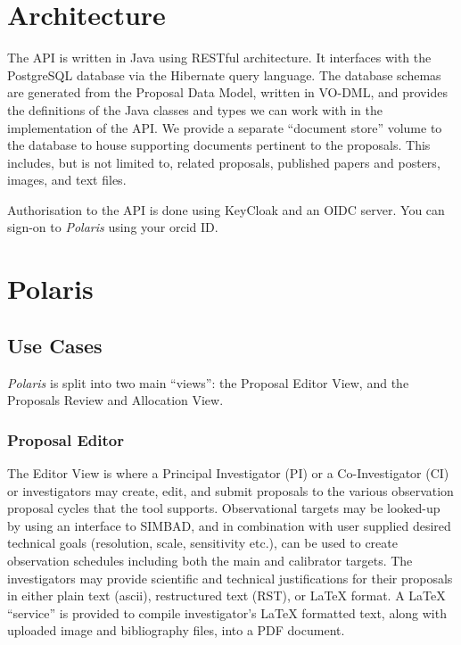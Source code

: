 \documentclass[11pt,twoside]{article}
\begin{document}

\section{Architecture}\label{sec:architecture}


The API is written in Java using RESTful architecture.
It interfaces with the PostgreSQL database via the Hibernate query language.
The database schemas are generated from the Proposal Data Model, written in VO-DML, and provides the
definitions of the Java classes and types we can work with in the implementation of the API\@.
We provide a separate ``document store'' volume to the database to house supporting documents pertinent
to the proposals.
This includes, but is not limited to, related proposals, published papers and posters, images, and text
files.

Authorisation to the API is done using KeyCloak and an OIDC server.
You can sign-on to \emph{Polaris} using your orcid ID\@.


\section{Polaris}\label{sec:polaris}

\subsection{Use Cases}\label{subsec:use-cases}

\emph{Polaris} is split into two main ``views'': the Proposal Editor View, and the Proposals Review
and Allocation View.

\subsubsection{Proposal Editor}\label{subsubsec:proposal-editor}


The Editor View is where a Principal Investigator (PI) or a Co-Investigator (CI) or investigators may create,
edit, and submit proposals to the various observation proposal cycles that the tool supports.
Observational targets may be looked-up by using an interface to SIMBAD, and in combination with user
supplied desired technical goals (resolution, scale, sensitivity etc.), can be used to create observation
schedules including both the main and calibrator targets.
The investigators may provide scientific and technical justifications for their proposals in either plain text
(ascii), restructured text (RST), or LaTeX format.
A LaTeX ``service'' is provided to compile investigator's LaTeX formatted text, along with uploaded image
and bibliography files, into a PDF document.
\end{document}
